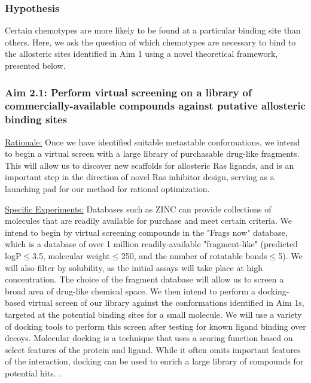 \documentclass[12pt]{article}
\begin{document}
\subsubsection*{Hypothesis}
Certain chemotypes are more likely to be found at a particular binding site than others. Here, we ask the question of which chemotypes are necessary to bind to the allosteric sites identified in Aim 1 using a novel theoretical framework, presented below.

\subsubsection*{Aim 2.1: Perform virtual screening on a library of commercially-available compounds against putative allosteric binding sites}

\underline{Rationale:} Once we have identified suitable metastable conformations, we intend to begin a virtual screen with a large library of purchasable drug-like fragments. This will allow us to discover new scaffolds for allosteric Ras ligands, and is an important step in the direction of novel Ras inhibitor design, serving as a launching pad for our method for rational optimization.

\underline{Specific Experiments:} Databases such as ZINC \cite{irwin2012} can provide collections of molecules that are readily available for purchase and meet certain criteria. We intend to begin by virtual screening compounds in the "Frags now"  database, which is a database of over 1 million readily-available "fragment-like" (predicted logP$\leq$3.5, molecular weight$\leq$250, and the number of rotatable bonds$\leq$5). We will also filter by solubility, as the initial assays will take place at high concentration. The choice of the fragment database will allow us to screen a broad area of drug-like chemical space. We then intend to perform a docking-based virtual screen of our library against the conformations identified in Aim 1s, targeted at the potential binding sites for a small molecule. We will use a variety of docking tools to perform this screen after testing for known ligand binding over decoys. Molecular docking is a technique that uses a scoring function based on select features of the protein and ligand. While it often omits important features of the interaction, docking can be used to enrich a large library of compounds for potential hits. \cite{dockingrev}. 
\end{document}
